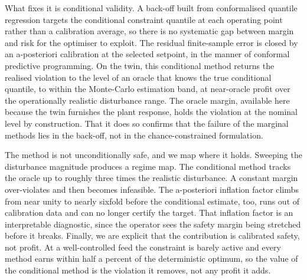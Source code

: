 \documentclass[review,times]{elsarticle}
\begin{document}
What fixes it is conditional validity. A back-off built from conformalised quantile
regression \citep{romano2019} targets the conditional constraint quantile at each operating
point rather than a calibration average, so there is no systematic gap between margin and
risk for the optimiser to exploit. The residual finite-sample error is closed by an
a-posteriori calibration at the selected setpoint, in the manner of conformal predictive
programming. On the twin, this conditional method returns the realised violation to the
level of an oracle that knows the true conditional quantile, to within the Monte-Carlo
estimation band, at near-oracle profit over the operationally realistic disturbance range.
The oracle margin, available here because the twin furnishes the plant response, holds the
violation at the nominal level by construction. That it does so confirms that the failure
of the marginal methods lies in the back-off, not in the chance-constrained formulation.

The method is not unconditionally safe, and we map where it holds. Sweeping the disturbance
magnitude produces a regime map. The conditional method tracks the oracle up to roughly
three times the realistic disturbance. A constant margin over-violates and then becomes
infeasible. The a-posteriori inflation factor climbs from near unity to nearly sixfold
before the conditional estimate, too, runs out of calibration data and can no longer
certify the target. That inflation factor is an interpretable diagnostic, since the operator
sees the safety margin being stretched before it breaks. Finally, we are explicit that the
contribution is calibrated safety, not profit. At a well-controlled feed the constraint is
barely active and every method earns within half a percent of the deterministic optimum, so
the value of the conditional method is the violation it removes, not any profit it adds.
\end{document}

